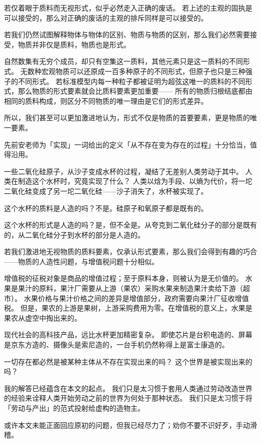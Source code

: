 \documentclass[a4paper,11pt]{article}
\begin{document}
若仅着眼于质料而无视形式，似乎必然走入正确的废话。
若上述的主观的固执是可以接受的，那么对正确的废话的主观的排斥同样是可以接受的。

若我们仍然试图解释物体与物体的区别、物质与物质的区别，那么我们必然需要接受，物质并非仅是质料，物质也是形式。

自然数集有无穷个成员，却只有空集这一质料，其他元素只是这一质料的不同形式。
无数种宏观物质可以还原成一百多种原子的不同形式，但原子也只是三种强子的不同形式。
若标准模型内每一种粒子都被证明为超弦这唯一的质料的不同形式，那么物质的形式要素就会比质料要素更加重要——
所有的物质归根结底都由相同的质料构成，则区分不同物质的唯一理由是它们的形式差异。

所以，我们甚至可以更加激进地认为，形式不仅是物质的首要要素，更是物质的唯一要素。








先前安老师为「实现」一词给出的定义「从不存在变为存在的过程」十分恰当，值得沿用。

一些二氧化硅原子，从沙子变成水杯的过程，凝结了无差别人类劳动于其中。
人类在制造这个水杯时，究竟实现了什么？
人类以焓为手段、以熵为代价，将一坨二氧化硅变成了另一坨二氧化硅——沙子消失了，水杯被实现了。

这个水杯的质料是人造的吗？不是。硅原子和氧原子都是既有的。

这个水杯的形式是人造的吗？是，但不全是。从夸克到二氧化硅分子的部分是既有的，从二氧化硅分子到水杯的部分是人造的。

若我们激进地无视物质的质料要素，仅承认形式要素，那么我们会得到有趣的巧合——物质的人造性问题，与增值税问题十分相似。

增值税的征税对象是商品的增值过程；至于原料本身，则被认为是无价值的。
水果是果汁的原料，果汁厂需要从上游（果农）采购水果来制造果汁卖给下游（超市）。
水果价格与果汁价格之间的差异是增值部分，政府需要向果汁厂征收增值税。
但是，果农的上游是果树，上游采购费用为零。在增值税的意义上，水果是果农从虚空中掏出来的。

现代社会的高科技产品，远比水杯更加精密复杂。
即使芯片是台积电造的、屏幕是京东方造的、摄像头是索尼造的，一台手机仍然称得上是富士康造的。









一切存在都必然是被某种主体从不存在实现出来的吗？
这个世界是被实现出来的吗？

我的解答已经蕴含在本文的起点。
我们只是太习惯于套用人类通过劳动改造世界的经验来诠释人类开始劳动之前的世界为何处于那种状态。
我们只是太习惯于将「劳动与产出」的范式投射给虚构的造物主。

或许本文未能正面回应原初的问题，但我已经尽力了；劝你不要不识好歹，手动滑稽。












\end{document}
